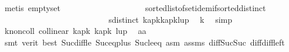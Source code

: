 \begin{isabellebody}
\ {\isacharparenleft}{\kern0pt}metis\ empty{\isacharunderscore}{\kern0pt}set\isanewline
\ \ \ \ \ \ \ \ \ \ \ \ \ \ \ \ \ \ \ \ sorted{\isacharunderscore}{\kern0pt}list{\isacharunderscore}{\kern0pt}of{\isacharunderscore}{\kern0pt}set{\isachardot}{\kern0pt}idem{\isacharunderscore}{\kern0pt}if{\isacharunderscore}{\kern0pt}sorted{\isacharunderscore}{\kern0pt}distinct{\isacharparenright}{\kern0pt}\isanewline
\isanewline
\ \ \ \ \ \ \ \ \ \ \ \ \isamarkupfalse%
\isanewline
\ \ \ \ \ \ \ \ \ \ \ \ \isamarkupfalse%
\ {\isachardoublequoteopen}sdistinct\ {\isacharbrackleft}{\kern0pt}{\isacharparenleft}{\kern0pt}kap{\isacharbang}{\kern0pt}{\isacharparenleft}{\kern0pt}k{\isacharminus}{\kern0pt}{}{\isacharparenright}{\kern0pt}{\isacharparenright}{\kern0pt}{\isacharcomma}{\kern0pt}{\isacharparenleft}{\kern0pt}kap{\isacharbang}{\kern0pt}{\isacharparenleft}{\kern0pt}k{\isacharminus}{\kern0pt}{}{\isacharparenright}{\kern0pt}{\isacharparenright}{\kern0pt}{\isacharcomma}{\kern0pt}{\isacharparenleft}{\kern0pt}lup{\isacharbang}{\kern0pt}{}{\isacharparenright}{\kern0pt}{\isacharbrackright}{\kern0pt}{\isachardoublequoteclose}\ \isamarkupfalse%
\ k{}{}\ \isamarkupfalse%
\ simp\isanewline
\ \ \ \ \ \ \ \ \ \ \ \ \isamarkupfalse%
\ k{\isacharunderscore}{\kern0pt}noncoll{\isacharcolon}{\kern0pt}{\isachardoublequoteopen}{\isasymnot}\ collinear{}\ {\isacharparenleft}{\kern0pt}kap{\isacharbang}{\kern0pt}{\isacharparenleft}{\kern0pt}k{\isacharminus}{\kern0pt}{}{\isacharparenright}{\kern0pt}{\isacharparenright}{\kern0pt}\ {\isacharparenleft}{\kern0pt}kap{\isacharbang}{\kern0pt}{\isacharparenleft}{\kern0pt}k{\isacharminus}{\kern0pt}{}{\isacharparenright}{\kern0pt}{\isacharparenright}{\kern0pt}\ {\isacharparenleft}{\kern0pt}lup{\isacharbang}{\kern0pt}{}{\isacharparenright}{\kern0pt}{\isachardoublequoteclose}\ \isamarkupfalse%
\ aa{}\isanewline
\ \ \ \ \ \ \ \ \ \ \ \ \ \ \isamarkupfalse%
\ {\isacharparenleft}{\kern0pt}smt\ {\isacharparenleft}{\kern0pt}verit{\isacharcomma}{\kern0pt}\ best{\isacharparenright}{\kern0pt}\ Suc{\isacharunderscore}{\kern0pt}diff{\isacharunderscore}{\kern0pt}le\ Suc{\isacharunderscore}{\kern0pt}eq{\isacharunderscore}{\kern0pt}plus{}\ Suc{\isacharunderscore}{\kern0pt}le{\isacharunderscore}{\kern0pt}eq\ asm{\isacharparenleft}{\kern0pt}{}{\isacharparenright}{\kern0pt}\ assms{\isacharparenleft}{\kern0pt}{}{\isacharparenright}{\kern0pt}\ diff{\isacharunderscore}{\kern0pt}Suc{\isacharunderscore}{\kern0pt}Suc\ diff{\isacharunderscore}{\kern0pt}diff{\isacharunderscore}{\kern0pt}left\isanewline

\end{isabellebody}
